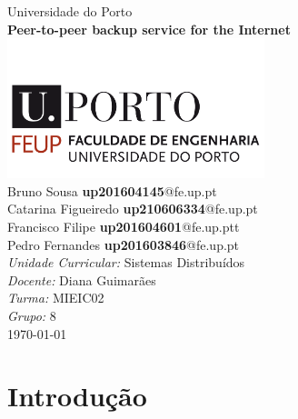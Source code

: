 \documentclass[11pt,oneside]{book}
\begin{document}
\begin{titlepage}

\begin{center}
{\LARGE Universidade do Porto}\\[1.5cm]
\linespread{1.0}\huge {\bfseries Peer-to-peer backup service for the Internet}\\[1.5cm]
\linespread{1}
\includegraphics[width=7.5cm]{feup.png}\\[1cm]

{\large Bruno Sousa \textbf{up201604145}@fe.up.pt}\\
{\large Catarina Figueiredo \textbf{up210606334}@fe.up.pt}\\
{\large Francisco Filipe \textbf{up201604601}@fe.up.ptt}\\
{\large Pedro Fernandes \textbf{up201603846}@fe.up.pt}\\[1cm]
{\large \emph{Unidade Curricular:} Sistemas Distribuídos}\\
{\large \emph{Docente:} Diana Guimarães}\\
{\large \emph{Turma:} MIEIC02}\\
{\large \emph{Grupo:} 8}\\[2cm]

\large \today
\end{center}

\end{titlepage}


\doublespacing
\tableofcontents
\singlespacing


\mainmatter

\section{Introdução}
\end{document}
